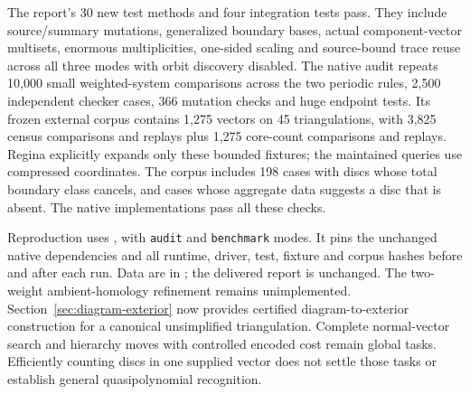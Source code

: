 The report's 30 new test methods and four integration tests pass. They include
source/summary mutations, generalized boundary bases, actual component-vector
multisets, enormous multiplicities, one-sided scaling and source-bound trace
reuse across all three modes with orbit discovery disabled. The native audit
repeats 10,000 small weighted-system comparisons across the two periodic rules,
2,500 independent checker cases, 366 mutation checks and huge endpoint tests.
Its frozen external corpus contains 1,275 vectors on 45 triangulations, with
3,825 census comparisons and replays plus 1,275 core-count comparisons and
replays. Regina explicitly expands only these bounded fixtures; the maintained
queries use compressed coordinates. The corpus includes 198 cases with discs
whose total boundary class cancels, and cases whose aggregate data suggests
a disc that is absent. The native implementations pass all these checks.



Reproduction uses , with
\texttt{audit} and \texttt{benchmark} modes. It pins the unchanged native
dependencies and all runtime, driver, test, fixture and corpus hashes before
and after each run. Data are in ; the delivered
report is unchanged. The two-weight ambient-homology refinement remains
unimplemented. Section~\ref{sec:diagram-exterior} now provides certified
diagram-to-exterior construction for a canonical unsimplified triangulation.
Complete normal-vector search and hierarchy moves with controlled encoded
cost remain global tasks. Efficiently counting discs in one supplied vector
does not settle those tasks or establish general quasipolynomial recognition.
